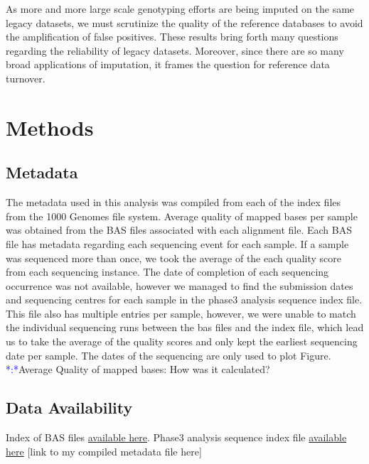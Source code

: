 \documentclass[]{elife}
\newcommand{\todo}[1]{\textcolor{blue}{*#1*}}
\begin{document}
As more and more large scale genotyping efforts are being imputed on the same legacy datasets, we must scrutinize the quality of the reference databases to avoid the amplification of false positives. 
These results bring forth many questions regarding the reliability of legacy datasets. 
Moreover, since there are so many broad applications of imputation, it frames the question for reference data turnover. 



\section{Methods}
\subsection{Metadata}
The metadata used in this analysis was compiled from each of the index files from the 1000 Genomes file system. 
Average quality of mapped bases per sample was obtained from the BAS files associated with each alignment file. 
Each BAS file has metadata regarding each sequencing event for each sample. 
If a sample was sequenced more than once, we took the average of the each quality score from each sequencing instance. 
The date of completion of each sequencing occurrence was not available, however we managed to find the submission dates and sequencing centres for each sample in the phase3 analysis sequence index file.  
This file also has multiple entries per sample, however, we were unable to match the individual sequencing runs between the bas files and the index file, which lead us to take the average of the quality scores and only kept the earliest sequencing date per sample. 
The dates of the sequencing are only used to plot Figure. \todo:{Average Quality of mapped bases: How was it calculated?}

\subsection{Data Availability}

Index of BAS files \href{http://ftp.1000genomes.ebi.ac.uk/vol1/ftp/data_collections/1000_genomes_project/1000genomes.low_coverage.GRCh38DH.alignment.index}{available here}.
Phase3 analysis sequence index file  \href{http://ftp.1000genomes.ebi.ac.uk/vol1/ftp/phase3/20130502.phase3.analysis.sequence.index}{available here} 
[link to my compiled metadata file here]
\end{document}
